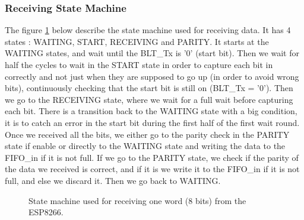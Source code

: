 \documentclass[11pt]{article}
\begin{document}
\subsubsection{Receiving State Machine}
The figure \ref{UART_receive_SM} below describe the state machine used for receiving data. It has 4 states : WAITING, START, RECEIVING and PARITY. It starts at the WAITING states, and wait until the BLT\_Tx is '0' (start bit). Then we wait for half the cycles to wait in the START state in order to capture each bit in correctly and not just when they are supposed to go up (in order to avoid wrong bits), continuously checking that the start bit is still on (BLT\_Tx = '0'). Then we go to the RECEIVING state, where we wait for a full wait before capturing each bit. There is a transition back to the WAITING state with a big condition, it is to catch an error in the start bit during the first half of the first wait round. Once we received all the bits, we either go to the parity check in the PARITY state if enable or directly to the WAITING state and writing the data to the FIFO\_in if it is not full. If we go to the PARITY state, we check if the parity of the data we received is correct, and if it is we write it to the FIFO\_in if it is not full, and else we discard it. Then we go back to WAITING.
\begin{figure}[H]
        \caption{State machine used for receiving one word (8 bits) from the ESP8266.}
        \label{UART_receive_SM}
\end{figure}
\newpage
\end{document}
